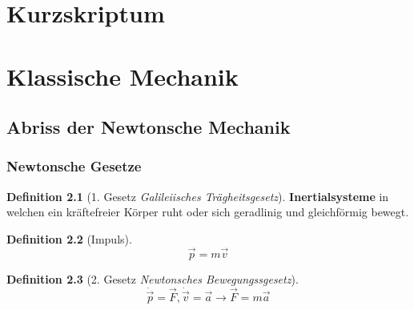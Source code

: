 \documentclass[oneside]{book}
\theoremstyle{definition}
\newtheorem*{definition*}{Definition}
\newcommand{\conseq}{$\rightarrow$~}
\begin{document}

\appendix

\chapter{Kurzskriptum}
\chapter{Klassische Mechanik}

\section{Abriss der Newtonsche Mechanik}


\subsection{Newtonsche Gesetze}
\begin{definition*}[1. Gesetz \textit{Galileiisches Trägheitsgesetz}] 
	\textbf{Inertialsysteme} in welchen ein kräftefreier Körper ruht oder sich geradlinig und gleichförmig bewegt.
\end{definition*}

\begin{definition*}[Impuls]
	\begin{equation*}
	\vec{p} = m \vec{v}
	\end{equation*}
\end{definition*}

\begin{definition*}[2. Gesetz \textit{Newtonsches Bewegungssgesetz}]
	\begin{equation*}
	\dot{\vec{p}} = \vec{F}, \dot{\vec{v}} = \vec{a} \rightarrow \vec{F} = m \vec{a}
	\end{equation*}
\end{definition*}
\end{document}
